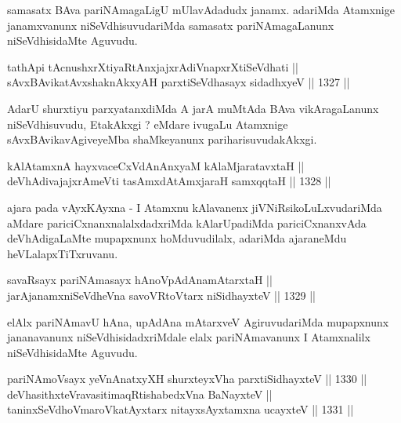 \begin{artha}
samasatx BAva pariNAmagaLigU mUlavAdadudx janamx. adariMda Atamxnige janamxvanunx niSeVdhisuvudariMda samasatx pariNAmagaLanunx niSeVdhisidaMte Aguvudu.
\end{artha}


\begin{shl}
tathA\s pi tAcnushxrXtiyaRtAnxjajxrAdiVnapxrXtiSeVdhati || \\
sAvxBAvikatAvxshaknAkxyAH parxtiSeVdhasayx sidadhxyeV ||  1327 ||  
\end{shl}

\begin{artha}
AdarU shurxtiyu parxyatanxdiMda A jarA muMtAda BAva vikAragaLanunx niSeVdhisuvudu, EtakAkxgi ? eMdare ivugaLu Atamxnige sAvxBAvikavAgiveyeMba shaMkeyanunx pariharisuvudakAkxgi.
\end{artha}


\begin{shl}
kAlAtamxnA hayxvaceCxVdAnAnxyaM kAlaMjaratavxtaH || \\
deVhAdivajajxrAmeVti tasAmxdAtAmx\s jaraH samxqqtaH ||  1328 ||  
\end{shl}

\begin{artha}
ajara pada vAyxKAyxna - I Atamxnu kAlavanenx jiVNiRsikoLuLxvudariMda aMdare pariciCxnanxnalalxdadxriMda kAlarUpadiMda pariciCxnanxvAda deVhAdigaLaMte mupapxnunx hoMduvudilalx, adariMda ajaraneMdu heVLalapxTiTxruvanu.
\end{artha}

\begin{shl}
savaRsayx pariNAmasayx hAnoVpAdAnamAtarxtaH || \\
jarAjanamxniSeVdheVna savoVR\s toV\s tarx niSidhayxteV ||  1329 ||  
\end{shl}

\begin{artha}
elAlx pariNAmavU hAna, upAdAna mAtarxveV AgiruvudariMda mupapxnunx jananavanunx niSeVdhisidadxriMdale elalx pariNAmavanunx I Atamxnalilx niSeVdhisidaMte Aguvudu.
\end{artha}


\begin{shl}
pariNAmoV\s sayx yeVnAnatxyXH shurxteyxVha parxtiSidhayxteV ||  1330 ||  \\
deVhasithxteVravasitimaqRtishabedxVna BaNayxteV ||  \\
taninxSeVdhoV\s maroVkatAyx\s tarx nitayxsAyx\s \s tamxna ucayxteV ||  1331 ||  
\end{shl}

